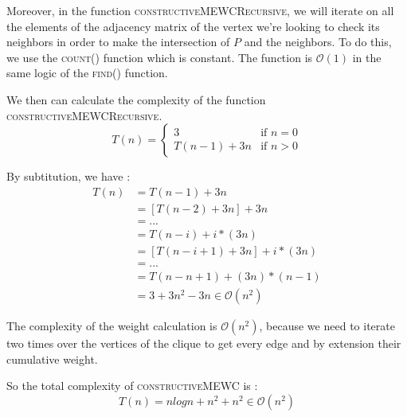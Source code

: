 Moreover, in the function \textsc{constructiveMEWCRecursive}, we will iterate on all the elements of the adjacency matrix of the vertex we're looking to check its neighbors in order to make the intersection of $P$ and the neighbors. To do this, we use the \textsc{count()} function which is constant\footnotemark. The function is $\mathcal{O}(1)$ in the same logic of the \textsc{find()} function.
\bigskip

We then can calculate the complexity of the function \textsc{constructiveMEWCRecursive}. 
\begin{equation}
    T(n)=\begin{cases}
        3        & \text{if } n=0 \\
        T(n-1) + 3n & \text{if } n>0
    \end{cases}
\end{equation}

By subtitution, we have :
\begin{align}
    T(n)&=T(n-1)+3n\\
    &=[T(n-2)+3n]+3n\\
    &=...\\
    &=T(n - i) + i*(3n) \\
    &=[T(n - i  + 1) + 3n] + i*(3n) \\
    &=...\\
    &=T(n - n + 1)+(3n)*(n-1) \\
    &= 3 + 3n^2 - 3n \in \mathcal{O}(n^2)
\end{align}

The complexity of the weight calculation is $\mathcal{O}(n^2)$, because we need to iterate two times over the vertices of the clique to get every edge and by extension their cumulative weight.
\bigskip

So the total complexity of \textsc{constructiveMEWC} is : 
$$ T(n) = n logn + n^2 + n^2 \in \mathcal{O}(n^2) $$